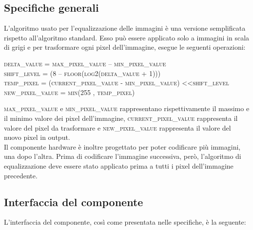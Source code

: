 \documentclass[12pt, table, xcdraw]{article}
\begin{document}
\subsection{Specifiche generali}
L'algoritmo usato per l'equalizzazione delle immagini è una versione semplificata rispetto all'algoritmo standard. Esso può essere applicato solo a immagini in scala di grigi e per trasformare ogni pixel dell'immagine, esegue le seguenti operazioni: 

\begin{center}

\textsc{delta\_value = max\_pixel\_value – min\_pixel\_value} \\
\textsc{shift\_level = (8 – floor(log2(delta\_value + 1)))} \\
\textsc{temp\_pixel = (current\_pixel\_value - min\_pixel\_value) \textless\textless  shift\_level} \\
\textsc{new\_pixel\_value = min(255 , temp\_pixel)} \\
\end{center}


\textsc{max\_pixel\_value} e \textsc{min\_pixel\_value} rappresentano rispettivamente il massimo e il minimo valore dei pixel dell'immagine, \textsc{current\_pixel\_value} rappresenta il valore del pixel da trasformare e \textsc{new\_pixel\_value} rappresenta il valore del nuovo pixel in output. \\

Il componente hardware è inoltre progettato per poter codificare più immagini, una dopo l'altra. Prima di codificare l'immagine successiva, però, l'algoritmo di equalizzazione deve essere stato applicato prima a tutti i pixel dell'immagine precedente.

\newpage

\subsection{Interfaccia del componente}
L’interfaccia del componente, così come presentata nelle specifiche, è la seguente:
\end{document}
